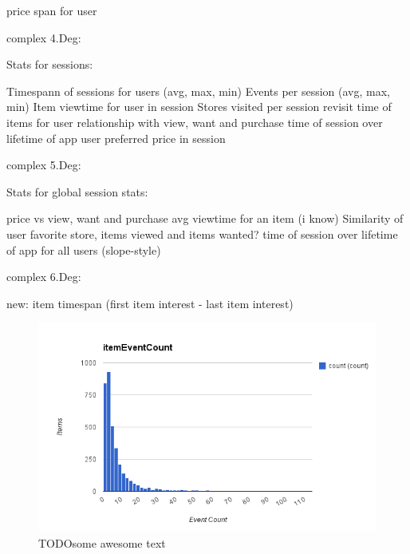             price span for user

        complex 4.Deg:

            Stats for sessions:

                Timespann of sessions for users (avg, max, min)
                Events per session (avg, max, min)
                Item viewtime for user in session
                Stores visited per session
                revisit time of items for user
                relationship with view, want and purchase
                time of session over lifetime of app
                user preferred price in session

        complex 5.Deg:

            Stats for global session stats:

                price vs view, want and purchase
                avg viewtime for an item (i know)
                Similarity of user favorite store, items viewed and items wanted?
                time of session over lifetime of app for all users (slope-style)

        complex 6.Deg:

        new:
            item timespan (first item interest - last item interest)

    \begin{figure}[H]
        \includegraphics[width=5in]{image/item-event-count.png}
        \centering
        \caption[Count of sessions per user mapped with count of user with give
        session amount]{TODOsome awesome text}
    \end{figure}

